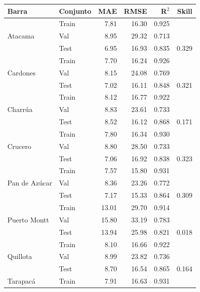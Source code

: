 \begin{table}[htbp]
    \centering
    \small
    \begin{tabular}{llrrrr}
        \toprule
        Barra & Conjunto & MAE & RMSE & R$^2$ & Skill \\
        \midrule
        \multirow{3}{*}{Atacama}
            & Train & 7.81 & 16.30 & 0.925 & \\
            & Val   & 8.95 & 29.32 & 0.713 & \\
            & Test  & 6.95 & 16.93 & 0.835 & 0.329 \\
        \midrule
        \multirow{3}{*}{Cardones}
            & Train & 7.70 & 16.24 & 0.926 & \\
            & Val   & 8.15 & 24.08 & 0.769 & \\
            & Test  & 7.02 & 16.11 & 0.848 & 0.321 \\
        \midrule
        \multirow{3}{*}{Charrúa}
            & Train & 8.12 & 16.77 & 0.922 & \\
            & Val   & 8.83 & 23.61 & 0.733 & \\
            & Test  & 8.52 & 16.12 & 0.868 & 0.171 \\
        \midrule
        \multirow{3}{*}{Crucero}
            & Train & 7.80 & 16.34 & 0.930 & \\
            & Val   & 8.80 & 28.50 & 0.733 & \\
            & Test  & 7.06 & 16.92 & 0.838 & 0.323 \\
        \midrule
        \multirow{3}{*}{Pan de Azúcar}
            & Train & 7.57 & 15.80 & 0.931 & \\
            & Val   & 8.36 & 23.26 & 0.772 & \\
            & Test  & 7.17 & 15.33 & 0.864 & 0.309 \\
        \midrule
        \multirow{3}{*}{Puerto Montt}
            & Train & 13.01 & 29.70 & 0.914 & \\
            & Val   & 15.80 & 33.19 & 0.783 & \\
            & Test  & 13.94 & 25.98 & 0.821 & 0.018 \\
        \midrule
        \multirow{3}{*}{Quillota}
            & Train & 8.10 & 16.66 & 0.922 & \\
            & Val   & 8.99 & 23.82 & 0.736 & \\
            & Test  & 8.70 & 16.54 & 0.865 & 0.164 \\
        \midrule
        \multirow{3}{*}{Tarapacá}
            & Train & 7.91 & 16.63 & 0.931 & \\

\end{tabular}
\end{table}
